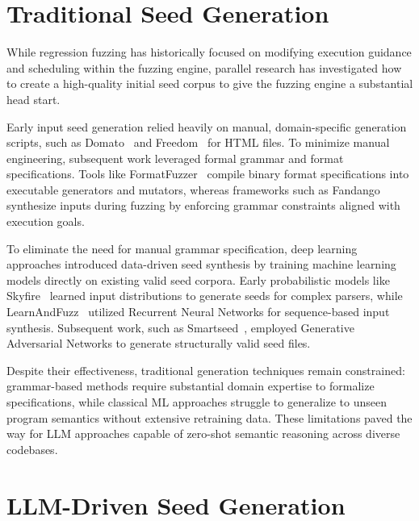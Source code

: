 \section{Traditional Seed Generation}
\label{sec:rw-traditional-generation}

While regression fuzzing has historically focused on modifying execution
guidance and scheduling within the fuzzing engine, parallel research has
investigated how to create a high-quality initial seed corpus to give the
fuzzing engine a substantial head start.

Early input seed generation relied heavily on manual, domain-specific generation
scripts, such as Domato~\cite{GoogleprojectzeroDomato2026} and
Freedom~\cite{xuFREEDOMEngineeringStateoftheArt2020a} for HTML files. To
minimize manual engineering, subsequent work leveraged formal grammar and format
specifications. Tools like
FormatFuzzer~\cite{dutraFormatFuzzerEffectiveFuzzing2023} compile binary format
specifications into executable generators and mutators, whereas frameworks such
as Fandango~\cite{zamudioamayaFANDANGOEvolvingLanguageBased2025,
bettscheiderCombiningInputConstraints2026} synthesize inputs during fuzzing by
enforcing grammar constraints aligned with execution goals.

To eliminate the need for manual grammar specification, deep learning approaches
introduced data-driven seed synthesis by training machine learning models
directly on existing valid seed corpora. Early probabilistic models like
Skyfire~\cite{wangSkyfireDataDrivenSeed2017} learned input distributions to
generate seeds for complex parsers, while
LearnAndFuzz~\cite{godefroidLearnFuzzMachineLearning2017} utilized Recurrent
Neural Networks for sequence-based input synthesis. Subsequent work, such as
Smartseed~\cite{lyuSmartSeedSmartSeed2019}, employed Generative Adversarial
Networks to generate structurally valid seed files.

Despite their effectiveness, traditional generation techniques remain
constrained: grammar-based methods require substantial domain expertise to
formalize specifications, while classical ML approaches struggle to generalize
to unseen program semantics without extensive retraining data. These limitations
paved the way for \ac{LLM} approaches capable of zero-shot semantic reasoning
across diverse codebases.

\section{LLM-Driven Seed Generation}
\label{sec:rw-llm-generation}

